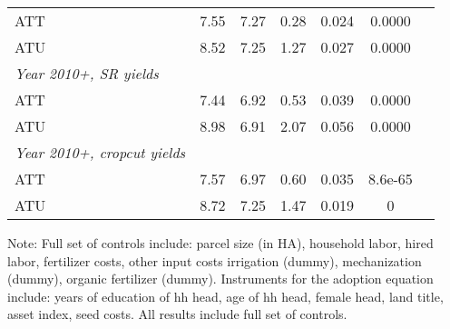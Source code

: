 \begin{table}[H]
{\begin{threeparttable}
\begin{tabular}{l cccccc}
ATT         &        7.55&        7.27&        0.28&       0.024&      0.0000\\
%
%
%
ATU         &        8.52&        7.25&        1.27&       0.027&      0.0000\\
%
%
%
\textit{Year 2010+, SR yields}&            &            &            &            &            \\
ATT         &        7.44&        6.92&        0.53&       0.039&      0.0000\\
%
%
%
ATU         &        8.98&        6.91&        2.07&       0.056&      0.0000\\
%
%
%
\textit{Year 2010+, cropcut yields}&            &            &            &            &            \\
ATT         &        7.57&        6.97&        0.60&       0.035&     8.6e-65\\
%
%
%
ATU         &        8.72&        7.25&        1.47&       0.019&           0\\
\hline
\hline
\end{tabular}
\begin{tablenotes}[flushleft]
\footnotesize
\item{Note: Full set of controls include: parcel size (in HA), household labor, hired labor, fertilizer costs, other input costs irrigation (dummy), mechanization (dummy), organic fertilizer (dummy). Instruments for the adoption equation include: years of education of hh head, age of hh head, female head, land title, asset index, seed costs. All results include full set of controls. }
\end{tablenotes}
\end{threeparttable}
}
\end{table}
